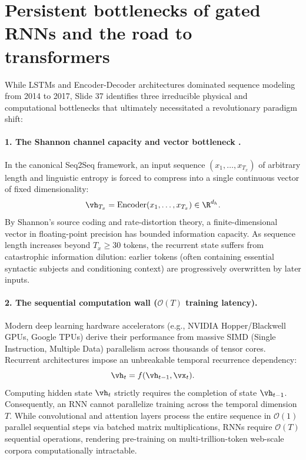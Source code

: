 \documentclass[../../main.tex]{subfiles}
\begin{document}
\section{Persistent bottlenecks of gated RNNs and the road to transformers}
\label{sec:rnn_bottlenecks}

While LSTMs and Encoder-Decoder architectures dominated sequence modeling from 2014 to 2017, Slide 37 identifies three irreducible physical and computational bottlenecks that ultimately necessitated a revolutionary paradigm shift:

\paragraph{1. The Shannon channel capacity and vector bottleneck \cite{sutskever2014}.}
In the canonical Seq2Seq framework, an input sequence $(x_1, \dots, x_{T_x})$ of arbitrary length and linguistic entropy is forced to compress into a single continuous vector of fixed dimensionality:
\begin{equation}
\vh_{T_x} = \operatorname{Encoder}(x_1, \dots, x_{T_x}) \in \R^{d_h}.
\end{equation}
By Shannon's source coding and rate-distortion theory, a finite-dimensional vector in floating-point precision has bounded information capacity. As sequence length increases beyond $T_x \ge 30$ tokens, the recurrent state suffers from catastrophic information dilution: earlier tokens (often containing essential syntactic subjects and conditioning context) are progressively overwritten by later inputs.

\paragraph{2. The sequential computation wall ($\mathcal{O}(T)$ training latency).}
Modern deep learning hardware accelerators (e.g., NVIDIA Hopper/Blackwell GPUs, Google TPUs) derive their performance from massive SIMD (Single Instruction, Multiple Data) parallelism across thousands of tensor cores. Recurrent architectures impose an unbreakable temporal recurrence dependency:
\begin{equation}
\vh_t = f(\vh_{t-1}, \vx_t).
\end{equation}
Computing hidden state $\vh_t$ strictly requires the completion of state $\vh_{t-1}$. Consequently, an RNN cannot parallelize training across the temporal dimension $T$. While convolutional and attention layers process the entire sequence in $\mathcal{O}(1)$ parallel sequential steps via batched matrix multiplications, RNNs require $\mathcal{O}(T)$ sequential operations, rendering pre-training on multi-trillion-token web-scale corpora computationally intractable.
\end{document}
